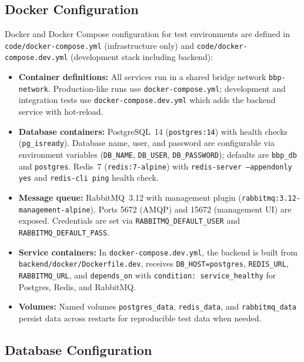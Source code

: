 \subsection{Docker Configuration}
\label{subsec:docker_configuration}%

Docker and Docker Compose configuration for test environments are defined in \texttt{code/docker-compose.yml} (infrastructure only) and \texttt{code/docker-compose.dev.yml} (development stack including backend):
\begin{itemize}
    \item \textbf{Container definitions:} All services run in a shared bridge network \texttt{bbp-network}. Production-like runs use \texttt{docker-compose.yml}; development and integration tests use \texttt{docker-compose.dev.yml} which adds the backend service with hot-reload.
    \item \textbf{Database containers:} PostgreSQL~14 (\texttt{postgres:14}) with health checks (\texttt{pg\_isready}). Database name, user, and password are configurable via environment variables (\texttt{DB\_NAME}, \texttt{DB\_USER}, \texttt{DB\_PASSWORD}); defaults are \texttt{bbp\_db} and \texttt{postgres}. Redis~7 (\texttt{redis:7-alpine}) with \texttt{redis-server --appendonly yes} and \texttt{redis-cli ping} health check.
    \item \textbf{Message queue:} RabbitMQ~3.12 with management plugin (\texttt{rabbitmq:3.12-management-alpine}). Ports 5672 (AMQP) and 15672 (management UI) are exposed. Credentials are set via \texttt{RABBITMQ\_DEFAULT\_USER} and \texttt{RABBITMQ\_DEFAULT\_PASS}.
    \item \textbf{Service containers:} In \texttt{docker-compose.dev.yml}, the backend is built from \texttt{backend/docker/Dockerfile.dev}, receives \texttt{DB\_HOST=postgres}, \texttt{REDIS\_URL}, \texttt{RABBITMQ\_URL}, and \texttt{depends\_on} with \texttt{condition: service\_healthy} for Postgres, Redis, and RabbitMQ.
    \item \textbf{Volumes:} Named volumes \texttt{postgres\_data}, \texttt{redis\_data}, and \texttt{rabbitmq\_data} persist data across restarts for reproducible test data when needed.
\end{itemize}

\subsection{Database Configuration}
\label{subsec:database_configuration}%


